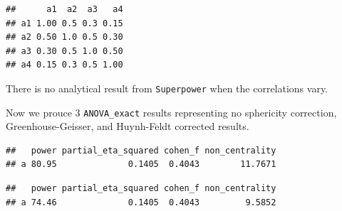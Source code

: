 \documentclass[]{book}
\newenvironment{Shaded}{\begin{snugshade}}{\end{snugshade}}
\newcommand{\DataTypeTok}[1]{\textcolor[rgb]{0.13,0.29,0.53}{#1}}
\newcommand{\KeywordTok}[1]{\textcolor[rgb]{0.13,0.29,0.53}{\textbf{#1}}}
\newcommand{\NormalTok}[1]{#1}
\newcommand{\OperatorTok}[1]{\textcolor[rgb]{0.81,0.36,0.00}{\textbf{#1}}}
\newcommand{\OtherTok}[1]{\textcolor[rgb]{0.56,0.35,0.01}{#1}}
\newcommand{\StringTok}[1]{\textcolor[rgb]{0.31,0.60,0.02}{#1}}
\begin{document}
\begin{Shaded}
\end{Shaded}

\begin{verbatim}
##      a1  a2  a3   a4
## a1 1.00 0.5 0.3 0.15
## a2 0.50 1.0 0.5 0.30
## a3 0.30 0.5 1.0 0.50
## a4 0.15 0.3 0.5 1.00
\end{verbatim}

There is no analytical result from \texttt{Superpower} when the correlations vary.

Now we prouce 3 \texttt{ANOVA\_exact} results representing no sphericity correction, Greenhouse-Geisser, and Huynh-Feldt corrected results.

\begin{Shaded}
\end{Shaded}

\begin{verbatim}
##   power partial_eta_squared cohen_f non_centrality
## a 80.95              0.1405  0.4043        11.7671
\end{verbatim}

\begin{Shaded}
\end{Shaded}

\begin{verbatim}
##   power partial_eta_squared cohen_f non_centrality
## a 74.46              0.1405  0.4043         9.5852
\end{verbatim}

\begin{Shaded}
\end{Shaded}
\end{document}
